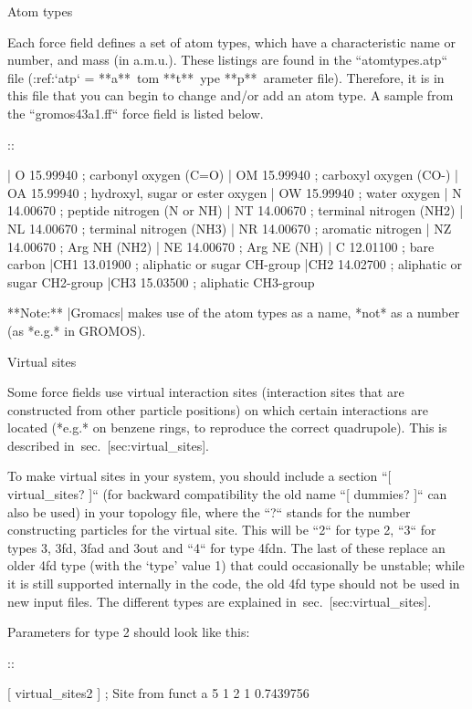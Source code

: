 Atom types
~~~~~~~~~~

Each force field defines a set of atom
types,
which have a characteristic name or number, and mass (in a.m.u.). These
listings are found in the ``atomtypes.atp`` file (:ref:`atp` =
**a**\ tom **t**\ ype **p**\ arameter file). Therefore, it is in this
file that you can begin to change and/or add an atom type. A sample from
the ``gromos43a1.ff`` force field is listed below.

::

     |  O  15.99940 ;     carbonyl oxygen (C=O)
     | OM  15.99940 ;     carboxyl oxygen (CO-)
     | OA  15.99940 ;     hydroxyl, sugar or ester oxygen
     | OW  15.99940 ;     water oxygen
     |  N  14.00670 ;     peptide nitrogen (N or NH)
     | NT  14.00670 ;     terminal nitrogen (NH2)
     | NL  14.00670 ;     terminal nitrogen (NH3)
     | NR  14.00670 ;     aromatic nitrogen
     | NZ  14.00670 ;     Arg NH (NH2)
     | NE  14.00670 ;     Arg NE (NH)
     |  C  12.01100 ;     bare carbon
     |CH1  13.01900 ;     aliphatic or sugar CH-group
     |CH2  14.02700 ;     aliphatic or sugar CH2-group
     |CH3  15.03500 ;     aliphatic CH3-group

**Note:** |Gromacs| makes use of the atom types as a name, *not* as a
number (as *e.g.* in GROMOS).

Virtual sites
~~~~~~~~~~~~~

Some force fields use virtual interaction sites (interaction sites that
are constructed from other particle positions) on which certain
interactions are located (*e.g.* on benzene rings, to reproduce the
correct quadrupole). This is described in sec. [sec:virtual\_sites].

To make virtual sites in your system, you should include a section
``[ virtual_sites? ]`` (for backward compatibility the old
name ``[ dummies? ]`` can also be used) in your topology
file, where the ``?`` stands for the number constructing
particles for the virtual site. This will be ``2`` for
type 2, ``3`` for types 3, 3fd, 3fad and 3out and
``4`` for type 4fdn. The last of these replace an older
4fd type (with the ‘type’ value 1) that could occasionally be unstable;
while it is still supported internally in the code, the old 4fd type
should not be used in new input files. The different types are explained
in sec. [sec:virtual\_sites].

Parameters for type 2 should look like this:

::

    [ virtual_sites2 ]
    ; Site  from        funct  a
    5       1     2     1      0.7439756

